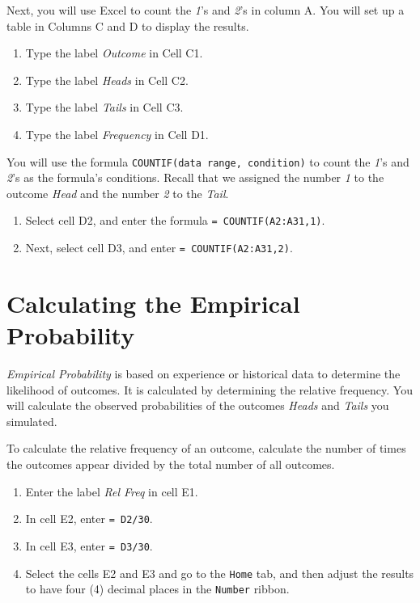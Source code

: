 \documentclass[
]{book}
\providecommand{\tightlist}{%
  \setlength{\itemsep}{0pt}\setlength{\parskip}{0pt}}
\begin{document}
Next, you will use Excel to count the \emph{1}'s and \emph{2}'s in column A. You will set up a table in Columns C and D to display the results.

\begin{enumerate}
\def\labelenumi{\arabic{enumi}.}
\tightlist
\item
  Type the label \emph{Outcome} in Cell C1.
\item
  Type the label \emph{Heads} in Cell C2.
\item
  Type the label \emph{Tails} in Cell C3.
\item
  Type the label \emph{Frequency} in Cell D1.
\end{enumerate}

You will use the formula \texttt{COUNTIF(data\ range,\ condition)} to count the \emph{1}'s and \emph{2}'s as the formula's conditions. Recall that we assigned the number \emph{1} to the outcome \emph{Head} and the number \emph{2} to the \emph{Tail}.

\begin{enumerate}
\def\labelenumi{\arabic{enumi}.}
\tightlist
\item
  Select cell D2, and enter the formula \texttt{=\ COUNTIF(A2:A31,1)}.
\item
  Next, select cell D3, and enter \texttt{=\ COUNTIF(A2:A31,2)}.
\end{enumerate}

\hypertarget{calculating-the-empirical-probability}{%
\section{Calculating the Empirical Probability}\label{calculating-the-empirical-probability}}

\emph{Empirical Probability} is based on experience or historical data to determine the likelihood of outcomes. It is calculated by determining the relative frequency. You will calculate the observed probabilities of the outcomes \emph{Heads} and \emph{Tails} you simulated.

To calculate the relative frequency of an outcome, calculate the number of times the outcomes appear divided by the total number of all outcomes.

\begin{enumerate}
\def\labelenumi{\arabic{enumi}.}
\tightlist
\item
  Enter the label \emph{Rel Freq} in cell E1.
\item
  In cell E2, enter \texttt{=\ D2/30}.
\item
  In cell E3, enter \texttt{=\ D3/30}.
\item
  Select the cells E2 and E3 and go to the \texttt{Home} tab, and then adjust the results to have four (4) decimal places in the \texttt{Number} ribbon.
\end{enumerate}
\end{document}
